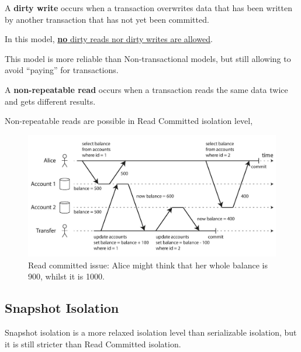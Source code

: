 \begin{definition}
   A \textbf{dirty write} occurs when a transaction overwrites data that has been written by another transaction that has not yet been committed.
\end{definition}

In this model, \ul{\textbf{no} dirty reads nor dirty writes are allowed}.

This model is more reliable than Non-transactional models, but still allowing to avoid ``paying'' for transactions.

\begin{definition}
   A \textbf{non-repeatable read} occurs when a transaction reads the same data twice and gets different results.
\end{definition}

Non-repeatable reads are possible in Read Committed isolation level, 

\begin{figure}[htbp]
   \centering
   \includegraphics{images/12/readcommitted_issue.png}
   \caption{Read committed issue: Alice might think that her whole balance is 900, whilst it is 1000.}
   \label{fig:12/readcommitted_issue}
\end{figure}

\subsection{Snapshot Isolation}
Snapshot isolation is a more relaxed isolation level than serializable isolation, but it is still stricter than Read Committed isolation.

